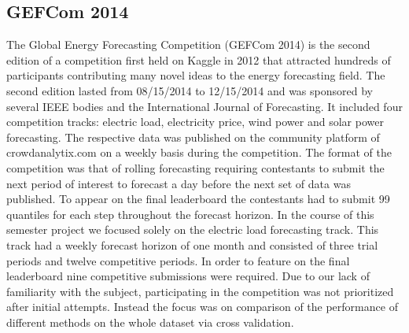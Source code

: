 \documentclass[conference]{IEEEtran}
\begin{document}
\subsection{GEFCom 2014}
The Global Energy Forecasting Competition (GEFCom 2014) is the second edition of a competition first held on Kaggle in 2012 that attracted hundreds of participants contributing many novel ideas to the energy forecasting field. The second edition lasted from 08/15/2014 to 12/15/2014 and was sponsored by several IEEE bodies and the International Journal of Forecasting. It included four competition tracks: electric load, electricity price, wind power and solar power forecasting. The respective data was published on the community platform of crowdanalytix.com on a weekly basis during the competition. The format of the competition was that of rolling forecasting requiring contestants to submit the next period of interest to forecast a day before the next set of data was published. To appear on the final leaderboard the contestants had to submit 99 quantiles for each step throughout the forecast horizon. In the course of this semester project we focused solely on the electric load forecasting track. This track had a weekly forecast horizon of one month and consisted of three trial periods and twelve competitive periods. In order to feature on the final leaderboard nine competitive submissions were required. Due to our lack of familiarity with the subject, participating in the competition was not prioritized after initial attempts. Instead the focus was on comparison of the performance of different methods on the whole dataset via cross validation.
\end{document}
